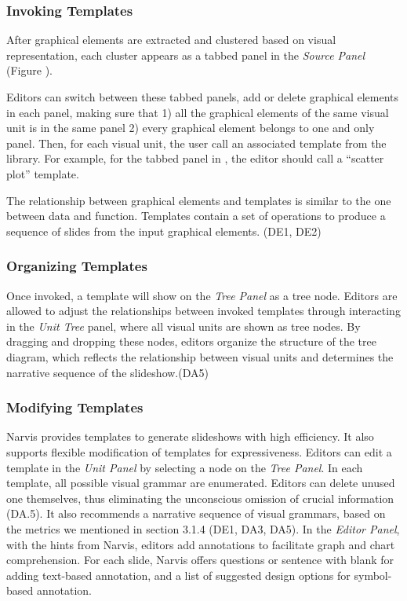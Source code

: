 \subsubsection{Invoking Templates} 

After graphical elements are extracted and clustered based on visual representation, each cluster appears as a tabbed panel in the \textit{Source Panel} (Figure ). 

Editors can switch between these tabbed panels, add or delete graphical elements in each panel, making sure that 1) all the graphical elements of the same visual unit is in the same panel 2) every graphical element belongs to one and only panel. Then, for each visual unit, the user call an associated template from the library. For example, for the tabbed panel in , the editor should call a ``scatter plot'' template.

The relationship between graphical elements and templates is similar to the one between data and function. Templates contain a set of operations to produce a sequence of slides from the input graphical elements.  (DE1, DE2) 

\subsubsection{Organizing Templates} 
Once invoked, a template will show on the \textit{Tree Panel} as a tree node. 
Editors are allowed to adjust the relationships between invoked templates through interacting in the \textit{Unit Tree} panel, where all visual units are shown as tree nodes.
By dragging and dropping these nodes, editors organize the structure of the tree diagram, which reflects the relationship between visual units and determines the narrative sequence of the slideshow.(DA5)

\subsubsection{Modifying Templates} 
Narvis provides templates to generate slideshows with high efficiency. 
It also supports flexible modification of templates for expressiveness.
Editors can edit a template in the \textit{Unit Panel} by selecting a node on the \textit{Tree Panel}. In each template, all possible visual grammar are enumerated. Editors can delete unused one themselves, thus eliminating the unconscious omission of crucial information (DA.5). It also recommends a narrative sequence of visual grammars, based on the metrics we mentioned in section 3.1.4 (DE1, DA3, DA5). 
In the \textit{Editor Panel}, with the hints from Narvis, editors add annotations to facilitate graph and chart comprehension. For each slide, Narvis offers questions or sentence with blank for adding text-based annotation, and a list of suggested design options for symbol-based annotation. 

